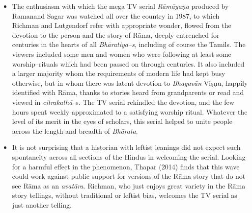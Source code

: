 \begin{itemize}
\item The enthusiasm with which the mega TV serial \textit{Rāmāyaṇa} produced by Ramanand Sagar was watched all over the country in 1987, to which Richman and Lutgendorf refer with appropriate wonder, flowed from the devotion to the person and the story of Rāma, deeply entrenched for centuries in the hearts of all \textit{Bhāratiya–s}, including of course the Tamils. The viewers included some men and women who were following at least some worship–rituals which had been passed on through centuries. It also included a larger majority whom the requirements of modern life had kept busy otherwise, but in whom there was latent devotion to \textit{Bhagavān} Viṣṇu, happily identified with Rāma, thanks to stories heard from grandparents or read and viewed in \textit{citrakathā}–s. The TV serial rekindled the devotion, and the few hours spent weekly approximated to a satisfying worship ritual. Whatever the level of its merit in the eyes of scholars, this serial helped to unite people across the length and breadth of \textit{Bhārata}.

 \item It is not surprising that a historian with leftist leanings did not expect such spontaneity across all sections of the Hindus in welcoming the serial. Looking for a harmful effect in the phenomenon, Thapar (2014) finds that this wave could work against public support for versions of the Rāma story that do not see Rāma as an \textit{avatāra}. Richman, who just enjoys great variety in the Rāma story tellings, without traditional or leftist bias, welcomes the TV serial as just another telling.


\end{itemize}
